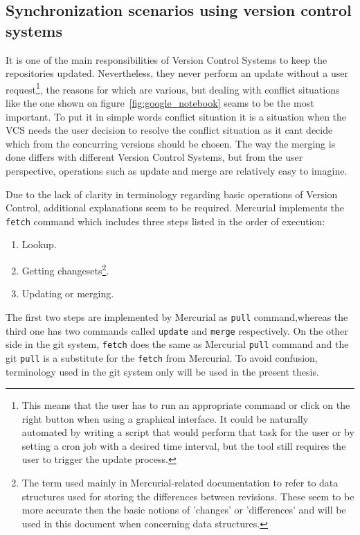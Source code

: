 \subsection{Synchronization scenarios using version control systems}\label{subsec:sync_scenarios}
It is one of the main responsibilities of Version Control Systems to keep the repositories updated. Nevertheless, they never perform an update without a user request\footnote{This means that the user has to run an appropriate command or click on the right button when using a graphical interface. It could be naturally automated by writing a script that would perform that task for the user or by setting a cron job with a desired time interval, but the tool still requires the user to trigger the update process.}, the reasons for which are various, but dealing with conflict situations like the one shown on figure~\ref{fig:google_notebook} seams to be the most important. To put it in simple words conflict situation it is a situation when the VCS needs the user decision to resolve the conflict situation as it cant decide which from the concurring versions should be chosen. The way the merging is done differs with different Version Control Systems, but from the user perspective, operations such as update and merge are relatively easy to imagine. 

Due to the lack of clarity in terminology regarding basic operations of Version Control, additional explanations seem to be required. Mercurial implements the \texttt{fetch} command  which includes three steps listed in the order of execution:
\begin{enumerate}
\item{Lookup.}
\item{Getting changesets\footnote{The term used mainly in Mercurial-related documentation to refer to data structures used for storing the differences between revisions. These seem to be more accurate then the basic notions of 'changes' or 'differences' and will be used in this document when concerning data structures.}.}
\item{Updating or merging.}
\end{enumerate}
The first two steps are implemented by Mercurial as \texttt{pull} command,whereas the third one has two commands called \texttt{update} and \texttt{merge} respectively. On the other side in the git system, \texttt{fetch} does the same as Mercurial \texttt{pull} command and the git \texttt{pull} is a substitute for the \texttt{fetch} from Mercurial. To avoid confusion, terminology used in the git system only will be used in the present thesis.

